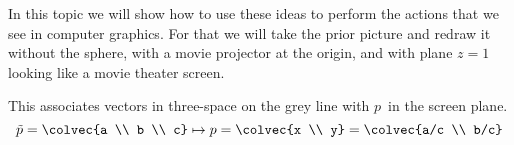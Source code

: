 In this topic we will show how to use these ideas to perform the actions that 
we see in computer graphics.
For that we will take the prior picture and redraw it without the sphere,
with a movie projector at the origin, and with plane $z=1$ looking like
a movie theater screen.
\begin{center} 
\end{center}
This associates vectors in three-space on the grey line with 
$p$~in the screen plane.
\begin{equation*}
  \tilde{p}=\colvec{a \\ b \\ c} 
  \mapsto 
  p=\colvec{x \\ y}=\colvec{a/c \\ b/c}
\end{equation*}

